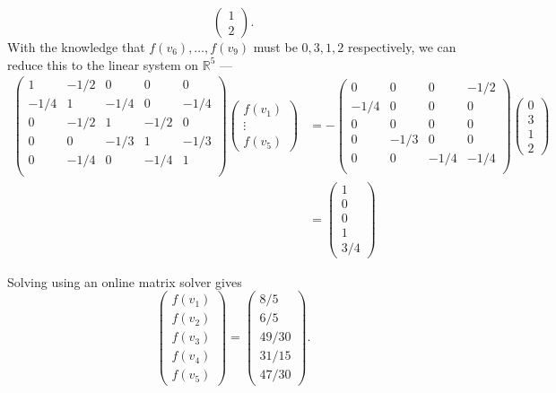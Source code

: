 \documentclass[12 pt, letterpaper]{hmcpset}
\begin{document}
\begin{solution}
\[\begin{pmatrix}
			1 \\
			2
		\end{pmatrix}.
	\]
	With the knowledge that $f(v_{6}), \dots, f(v_{9})$ must be $0, 3, 1, 2$ respectively, we can reduce this to the linear system on $\mathbb{R}^{5}$ ---
	\begin{align*}
		\begin{pmatrix}
			1 & -1/2 & 0 & 0 & 0 \\
			-1/4 & 1 & -1/4 & 0 & -1/4 \\
			0 & -1/2 & 1 & -1/2 & 0 \\
			0 & 0 & -1/3 & 1 & -1/3 \\
			0 & -1/4 & 0 & -1/4 & 1 \\
		\end{pmatrix} \begin{pmatrix}
			f(v_{1}) \\
			\vdots \\
			f(v_{5})
			\end{pmatrix} & = - \begin{pmatrix}
			0 & 0 & 0 & -1/2 \\
			-1/4 & 0 & 0 & 0 \\
			0 & 0 & 0 & 0 \\
			0 & -1/3 & 0 & 0 \\
			0 & 0 & -1/4 & -1/4 \\
		\end{pmatrix} \begin{pmatrix}
			0 \\
			3 \\
			1 \\
			2
		\end{pmatrix} \\
		& = \begin{pmatrix}
			1 \\
			0 \\
			0 \\
			1 \\
			3/4
		\end{pmatrix}
	\end{align*}

	Solving using an online matrix solver gives
	\[
		\begin{pmatrix}
			f(v_{1}) \\
			f(v_{2}) \\
			f(v_{3}) \\
			f(v_{4}) \\
			f(v_{5})
		\end{pmatrix} = \begin{pmatrix}
			8/5 \\
			6/5 \\
			49/30 \\
			31/15 \\
			47/30
		\end{pmatrix}.
	\]
\end{solution}
\end{document}
